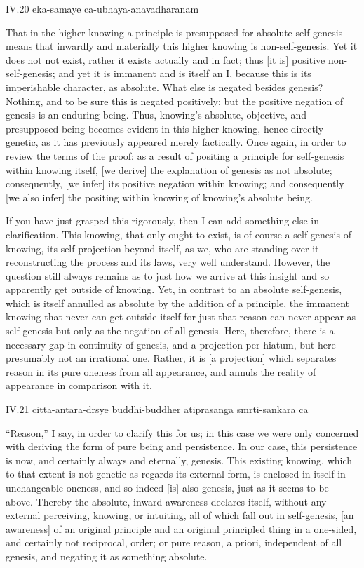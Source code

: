 IV.20
eka-samaye ca-ubhaya-anavadharanam

That in the higher knowing
a principle is presupposed for absolute self-genesis
means that inwardly and materially
this higher knowing is non-self-genesis.
Yet it does not not exist,
rather it exists actually and in fact;
thus [it is] positive non-self-genesis;
and yet it is immanent and is itself an I,
because this is its imperishable character, as absolute.
What else is negated besides genesis?
Nothing, and to be sure this is negated positively;
but the positive negation of genesis is an enduring being.
Thus, knowing's absolute, objective,
and presupposed being becomes evident
in this higher knowing, hence directly genetic,
as it has previously appeared merely factically.
Once again, in order to review the terms of the proof:
as a result of positing a principle
for self-genesis within knowing itself,
[we derive] the explanation of genesis as not absolute;
consequently, [we infer] its positive negation within knowing;
and consequently [we also infer] the positing within knowing
of knowing's absolute being.

If you have just grasped this rigorously,
then I can add something else in clarification.
This knowing, that only ought to exist, is of course
a self-genesis of knowing, its self-projection beyond itself,
as we, who are standing over it reconstructing
the process and its laws, very well understand.
However, the question still always remains as
to just how we arrive at this insight
and so apparently get outside of knowing.
Yet, in contrast to an absolute self-genesis,
which is itself annulled as absolute
by the addition of a principle,
the immanent knowing that never can get outside itself
for just that reason can never appear as self-genesis
but only as the negation of all genesis.
Here, therefore, there is a necessary gap
in continuity of genesis,
and a projection per hiatum,
but here presumably not an irrational one.
Rather, it is [a projection] which separates
reason in its pure oneness from all appearance,
and annuls the reality of appearance in comparison with it.

IV.21
citta-antara-drsye buddhi-buddher atiprasanga smrti-sankara ca

“Reason,” I say, in order to clarify this for us;
in this case we were only concerned with deriving
the form of pure being and persistence.
In our case, this persistence is now,
and certainly always and eternally, genesis.
This existing knowing, which to that extent
is not genetic as regards its external form,
is enclosed in itself in unchangeable oneness,
and so indeed [is] also genesis,
just as it seems to be above.
Thereby the absolute, inward awareness declares itself,
without any external perceiving, knowing, or intuiting,
all of which fall out in self-genesis,
[an awareness] of an original principle
and an original principled thing
in a one-sided, and certainly not reciprocal, order;
or pure reason, a priori,
independent of all genesis,
and negating it as something absolute.

